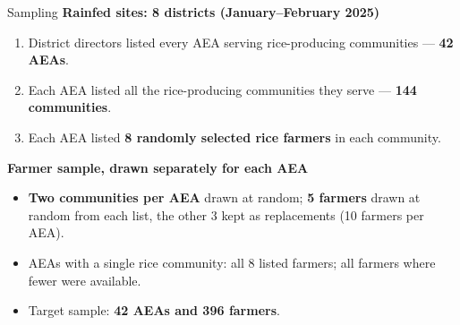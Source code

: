 \documentclass[aspectratio=169]{beamer}
\begin{document}
\begin{frame}{Sampling}
	\footnotesize
	\textbf{Rainfed sites: 8 districts (January--February 2025)}
	\begin{enumerate}
		\item District directors listed every AEA serving rice-producing communities --- \textbf{42 AEAs}.
		\item Each AEA listed all the rice-producing communities they serve --- \textbf{144 communities}.
		\item Each AEA listed \textbf{8 randomly selected rice farmers} in each community.
	\end{enumerate}
	\vspace{0.18cm}
	\textbf{Farmer sample, drawn separately for each AEA}
	\begin{itemize}
		\item \textbf{Two communities per AEA} drawn at random; \textbf{5 farmers} drawn at random from
		each list, the other 3 kept as replacements (10 farmers per AEA).
		\item AEAs with a single rice community: all 8 listed farmers; all farmers where fewer were available.
		\item Target sample: \textbf{42 AEAs and 396 farmers}.
	\end{itemize}
\end{frame}
\end{document}
